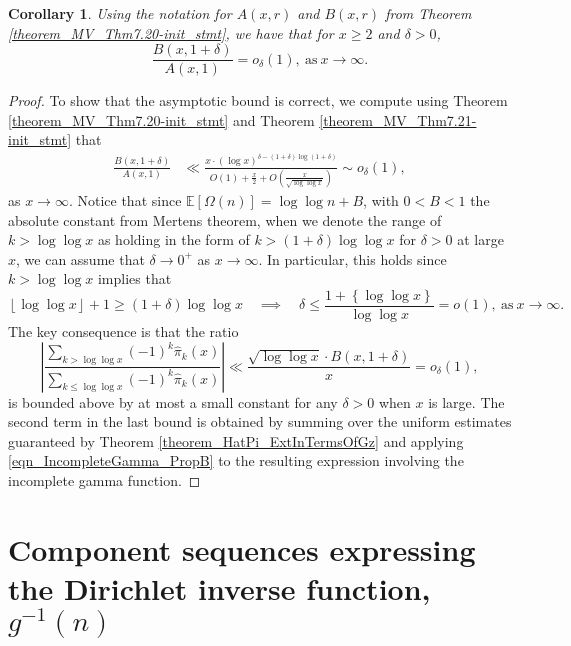 \documentclass[11pt,reqno,a4letter]{article}
\numberwithin{figure}{section}
\numberwithin{table}{section}
\newcommand{\floor}[1]{\left\lfloor #1 \right\rfloor}
\theoremstyle{plain}
\newtheorem{cor}[theorem]{Corollary}
\numberwithin{theorem}{section}
\theoremstyle{definition}
\begin{document}
\begin{cor} 
\label{theorem_MV_Thm7.20} 
Using the notation for $A(x, r)$ and $B(x, r)$ from 
Theorem \ref{theorem_MV_Thm7.20-init_stmt}, 
we have that for $x \geq 2$ and $\delta > 0$, 
\[
\frac{B(x, 1+\delta)}{A(x, 1)} = o_{\delta}(1), 
     \mathrm{\ as\ } x \rightarrow \infty. 
\]
\end{cor} 
\begin{proof} 
To show that the asymptotic bound is correct, we compute using 
Theorem \ref{theorem_MV_Thm7.20-init_stmt} and 
Theorem \ref{theorem_MV_Thm7.21-init_stmt} that 
\begin{align*} 
\frac{B(x, 1+\delta)}{A(x, 1)} & \ll 
     \frac{x \cdot (\log x)^{\delta - (1+\delta)\log(1+\delta)}}{ 
     O(1) + \frac{x}{2} + 
     O\left(\frac{x}{\sqrt{\log\log x}}\right)} 
     \sim 
     o_{\delta}(1),  
\end{align*} 
as $x \rightarrow \infty$. Notice that since $\mathbb{E}[\Omega(n)] = \log\log n + B$, with $0 < B < 1$ the 
absolute constant from Mertens theorem, 
when we denote the range of $k > \log\log x$ as holding in the form of 
$k > (1 + \delta) \log\log x$ for $\delta > 0$ at large $x$, we can assume that 
$\delta \rightarrow 0^{+}$ as $x \rightarrow \infty$. 
In particular, this holds since $k > \log\log x$ implies that 
\[
\floor{\log\log x} + 1 \geq (1 + \delta) \log\log x \quad\implies\quad 
     \delta \leq \frac{1 + \left\{\log\log x\right\}}{\log\log x} = o(1), 
     \mathrm{\ as\ } x \rightarrow \infty. 
\] 
The key consequence is that the ratio 
\[
\left\lvert \frac{\sum\limits_{k > \log\log x} (-1)^k \widehat{\pi}_k(x)}{ 
     \sum\limits_{k \leq \log\log x} (-1)^k \widehat{\pi}_k(x)} \right\rvert 
     \ll 
     \frac{\sqrt{\log\log x} \cdot B(x, 1+\delta)}{x} = o_{\delta}(1), 
\] 
is bounded above by at most a small constant for any $\delta > 0$ when $x$ is large. 
The second term in the last bound is obtained by summing over the uniform estimates 
guaranteed by Theorem \ref{theorem_HatPi_ExtInTermsOfGz} and 
applying \eqref{eqn_IncompleteGamma_PropB} to the 
resulting expression involving the incomplete gamma function. 
\end{proof} 

\newpage
\section{Component sequences expressing the Dirichlet inverse function, $g^{-1}(n)$} 
\label{Section_InvFunc_PreciseExpsAndAsymptotics} 
\end{document}
